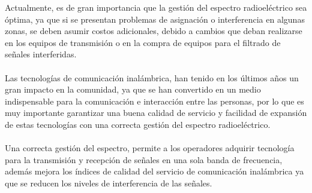 Actualmente, es de gran importancia que la gestión del espectro radioeléctrico sea óptima, ya que si se presentan problemas de asignación o interferencia en algunas zonas, se deben asumir costos adicionales, debido a cambios que deban realizarse en los equipos de transmisión o en la compra de equipos para el filtrado de señales interferidas.	
\\\\
Las tecnologías de comunicación inalámbrica, han tenido en los últimos años un gran impacto en la comunidad, ya que se han convertido en un medio indispensable para la comunicación e interacción entre las personas, por lo que es muy importante garantizar una buena calidad de servicio y facilidad de expansión de estas tecnologías con una correcta gestión del espectro radioeléctrico.
\\\\
Una correcta gestión del espectro, permite a los operadores adquirir tecnología para la transmisión y recepción de señales en una sola banda de frecuencia, además mejora los índices de calidad del servicio de comunicación inalámbrica ya que se reducen los niveles de interferencia de las señales.


